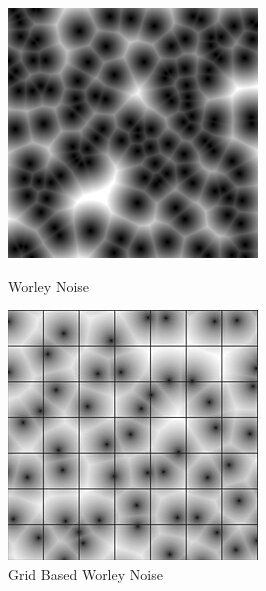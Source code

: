 \begin{figure}[H]
    \centering
    \begin{minipage}[t]{0.45\textwidth}
        \centering
        \includegraphics[width=\textwidth]{images/worley.jpg}
        \caption{Worley Noise \cite{wikipedia_worley} }
        \label{fig:worley_eg}
    \end{minipage}
    \hfill
    \begin{minipage}[t]{0.45\textwidth}
        \centering
        \includegraphics[width=\textwidth]{images/worley_with_grid.jpg}
        \caption{Grid Based Worley Noise \cite{wikipedia_worley}}
        \label{fig:worley_grid}
    \end{minipage}
\end{figure}

